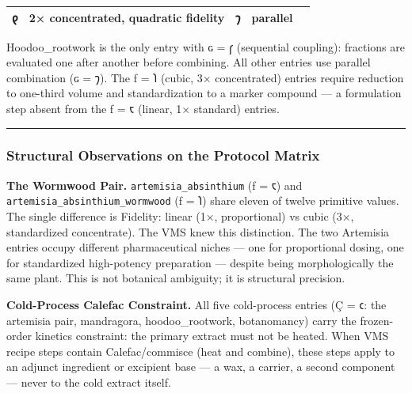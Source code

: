 \begin{longtable}[]{@{}lllll@{}}
\begin{minipage}[t]{0.17\columnwidth}
𐑞\strut
\end{minipage} & \begin{minipage}[t]{0.17\columnwidth}\raggedright
2× concentrated, quadratic fidelity\strut
\end{minipage} & \begin{minipage}[t]{0.17\columnwidth}\raggedright
𐑠\strut
\end{minipage} & \begin{minipage}[t]{0.17\columnwidth}\raggedright
parallel\strut
\end{minipage}\tabularnewline
\bottomrule
\end{longtable}

Hoodoo\_rootwork is the only entry with ɢ = 𐑝 (sequential coupling):
fractions are evaluated one after another before combining. All other
entries use parallel combination (ɢ = 𐑠). The ƒ = 𐑐 (cubic, 3×
concentrated) entries require reduction to one-third volume and
standardization to a marker compound --- a formulation step absent from
the ƒ = 𐑱 (linear, 1× standard) entries.

\begin{center}\rule{0.5\linewidth}{0.5pt}\end{center}

\hypertarget{structural-observations-on-the-protocol-matrix}{%
\subsubsection{Structural Observations on the Protocol
Matrix}\label{structural-observations-on-the-protocol-matrix}}

\textbf{The Wormwood Pair.} \texttt{artemisia\_absinthium} (ƒ = 𐑱) and
\texttt{artemisia\_absinthium\_wormwood} (ƒ = 𐑐) share eleven of twelve
primitive values. The single difference is Fidelity: linear (1×,
proportional) vs cubic (3×, standardized concentrate). The VMS knew this
distinction. The two Artemisia entries occupy different pharmaceutical
niches --- one for proportional dosing, one for standardized
high-potency preparation --- despite being morphologically the same
plant. This is not botanical ambiguity; it is structural precision.

\textbf{Cold-Process Calefac Constraint.} All five cold-process entries
(Ç = 𐑤: the artemisia pair, mandragora, hoodoo\_rootwork, botanomancy)
carry the frozen-order kinetics constraint: the primary extract must not
be heated. When VMS recipe steps contain Calefac/commisce (heat and
combine), these steps apply to an adjunct ingredient or excipient base
--- a wax, a carrier, a second component --- never to the cold extract
itself.

